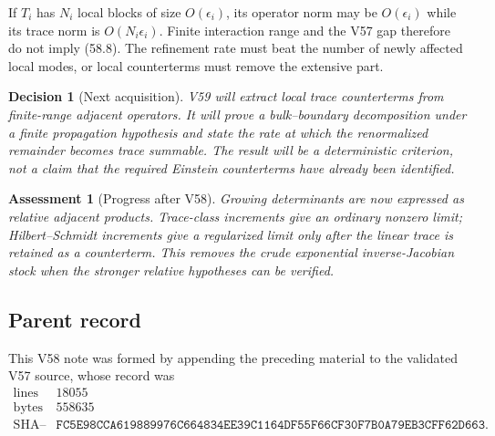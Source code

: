 \documentclass[11pt]{article}
\newtheorem{assessment}[theorem]{Assessment}
\newtheorem{decision}[theorem]{Decision}
\begin{document}
\begin{warning}
\label{warn:v11v58-locality}
If \(T_i\) has \(N_i\) local blocks of size \(O(\epsilon_i)\), its
operator norm may be \(O(\epsilon_i)\) while its trace norm is
\(O(N_i\epsilon_i)\).  Finite interaction range and the V57 gap
therefore do not imply (58.8).  The refinement rate must beat the
number of newly affected local modes, or local counterterms must remove
the extensive part.
\end{warning}

\begin{decision}[Next acquisition]
\label{dec:v11v58-next}
V59 will extract local trace counterterms from finite-range adjacent
operators.  It will prove a bulk--boundary decomposition under a
finite propagation hypothesis and state the rate at which the
renormalized remainder becomes trace summable.  The result will be a
deterministic criterion, not a claim that the required Einstein
counterterms have already been identified.
\end{decision}

\begin{assessment}[Progress after V58]
\label{ass:v11v58-status}
Growing determinants are now expressed as relative adjacent products.
Trace-class increments give an ordinary nonzero limit; Hilbert--Schmidt
increments give a regularized limit only after the linear trace is
retained as a counterterm.  This removes the crude exponential
inverse-Jacobian stock when the stronger relative hypotheses can be
verified.
\end{assessment}

\subsection{Parent record}

This V58 note was formed by appending the preceding material to the
validated V57 source, whose record was
\[
\begin{array}{c|c}
\text{lines}&18055\\
\text{bytes}&558635\\
\text{SHA--256}&
\texttt{FC5E98CCA619889976C664834EE39C1164DF55F66CF30F7B0A79EB3CFF62D663}.
\end{array}                                                     \tag{58.22}
\]

\end{document}
